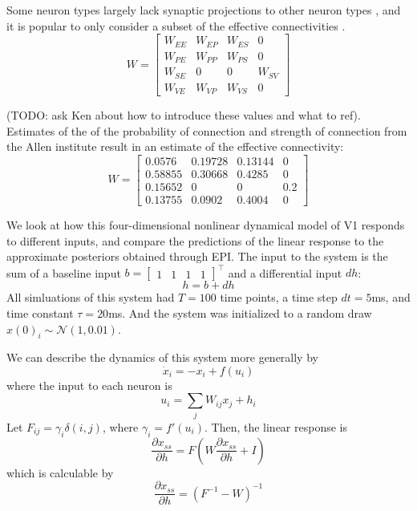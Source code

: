 \documentclass[11pt]{article}
\begin{document}
Some neuron types largely lack synaptic projections to other neuron types \cite{pfeffer2013inhibition}, and it is popular to only consider a subset of the effective connectivities \cite{litwin2016inhibitory}.
\begin{equation}
W = \begin{bmatrix} W_{EE} & W_{EP} & W_{ES} & 0 \\
                                W_{PE} & W_{PP} & W_{PS} & 0 \\
                                W_{SE} & 0 & 0 & W_{SV} \\
                                W_{VE} & W_{VP} &  W_{VS} &  0 \end{bmatrix}
\end{equation}

(TODO: ask Ken about how to introduce these values and what to ref).
Estimates of the of the probability of connection and strength of connection from the Allen institute result in an estimate of the effective connectivity: 
\begin{equation}
W = \begin{bmatrix} 0.0576 &  0.19728 & 0.13144 & 0 \\
                                0.58855 & 0.30668 & 0.4285 & 0 \\
                                0.15652 & 0 & 0 & 0.2 \\
                                0.13755 & 0.0902 &  0.4004 &  0 \end{bmatrix}
\end{equation}

We look at how this four-dimensional nonlinear dynamical model of V1 responds to different inputs, and compare the predictions of the linear response to the approximate posteriors obtained through EPI.  The input to the system is the sum of a baseline input $b = \begin{bmatrix} 1 & 1 & 1 & 1 \end{bmatrix}^\top$ and a differential input $dh$:
\begin{equation}
h = b + dh
\end{equation}
All simluations of this system had $T=100$ time points, a time step $dt = 5$ms, and time constant $\tau = 20$ms.  And the system was initialized to a random draw $x(0)_i \sim \mathcal{N}(1, 0.01)$.

We can describe the dynamics of this system more generally by
\begin{equation}
\dot{x}_i = -x_i + f(u_i)
\end{equation}
where the input to each neuron is
\begin{equation}
u_i = \sum_j W_{ij} x_j + h_i
\end{equation}
Let $F_{ij} = \gamma_i \delta(i,j)$, where $\gamma_i = f'(u_i)$.  Then, the linear response is
\begin{equation}
\frac{\partial x_{ss}}{\partial h} = F(W\frac{\partial x_{ss}}{\partial h} + I)
\end{equation}
which is calculable by
\begin{equation}
\frac{\partial x_{ss}}{\partial h} = (F^{-1} - W)^{-1}
\end{equation}
\end{document}
